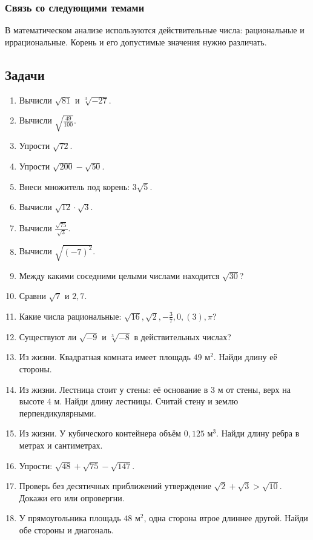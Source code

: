 \documentclass[12pt,a4paper]{article}
\theoremstyle{definition}
\theoremstyle{plain}
\theoremstyle{remark}
\newcommand{\starmark}{\ensuremath{{}^{\ast}}}
\begin{document}
\subsubsection*{Связь со следующими темами}
В математическом анализе используются действительные числа: рациональные и иррациональные. Корень и его допустимые значения нужно различать.
\subsection*{Задачи}
\begin{enumerate}[label=\thesection.\arabic*.,leftmargin=2.8em,itemsep=12pt]
\item Вычисли \(\sqrt{81}\) и \(\sqrt[3]{- 27}\).
\item Вычисли \(\sqrt{\frac{49}{100}}\).
\item Упрости \(\sqrt{72}\).
\item Упрости \(\sqrt{200} - \sqrt{50}\).
\item Внеси множитель под корень: \(3 \sqrt{5}\).
\item Вычисли \(\sqrt{12} \cdot  \sqrt{3}\).
\item Вычисли \(\frac{\sqrt{75}}{\sqrt{3}}\).
\item Вычисли \(\sqrt{(- 7)^{2}}\).
\item Между какими соседними целыми числами находится \(\sqrt{30}\)?
\item Сравни \(\sqrt{7}\) и \(2{,}7\).
\item Какие числа рациональные: \(\sqrt{16},\allowbreak \sqrt{2},\allowbreak - \frac{3}{7},\allowbreak 0{,}(3),\allowbreak \pi \)?
\item Существуют ли \(\sqrt{- 9}\) и \(\sqrt[3]{- 8}\) в действительных числах?
\item Из жизни. Квадратная комната имеет площадь \(49\) м\(^{2}\). Найди длину её стороны.
\item Из жизни. Лестница стоит у стены: её основание в \(3\) м от стены, верх на высоте \(4\) м. Найди длину лестницы. Считай стену и землю перпендикулярными.
\item Из жизни. У кубического контейнера объём \(0{,}125\) м\(^{3}\). Найди длину ребра в метрах и сантиметрах.
\item[\textbf{7.16.}\starmark] Упрости: \(\sqrt{48} + \sqrt{75} - \sqrt{147}\).
\item[\textbf{7.17.}\starmark] Проверь без десятичных приближений утверждение \(\sqrt{2} + \sqrt{3} > \sqrt{10}\). Докажи его или опровергни.
\item[\textbf{7.18.}\starmark] У прямоугольника площадь \(48\) м\(^{2}\), одна сторона втрое длиннее другой. Найди обе стороны и диагональ.
\end{enumerate}
\clearpage
\end{document}
